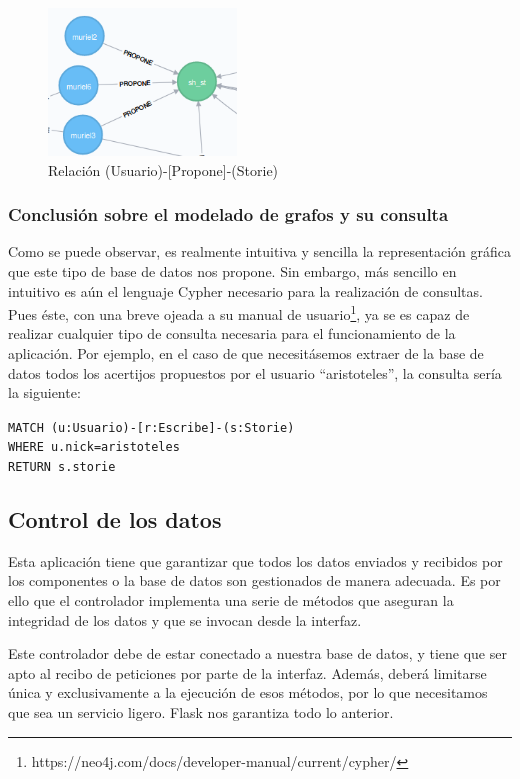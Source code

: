 \begin{figure}[hbtp]
     \centerline{\includegraphics[width=5cm]{figuras/propone.png}}
    \caption{Relación (Usuario)-[Propone]-(Storie)} 
    \label{fig::propone}
\end{figure}

\subsubsection{Conclusión sobre el modelado de grafos y su consulta}

Como se puede observar, es realmente intuitiva y sencilla la representación gráfica que este tipo de base de datos nos propone. Sin embargo, más sencillo  en intuitivo es aún el lenguaje Cypher necesario para la realización de consultas. Pues éste, con una breve ojeada a su manual de usuario\footnote{https://neo4j.com/docs/developer-manual/current/cypher/}, ya se es capaz de realizar cualquier tipo de consulta necesaria para el funcionamiento de la aplicación. Por ejemplo, en el caso de que necesitásemos extraer de la base de datos todos los acertijos propuestos por el usuario ``aristoteles'', la consulta sería la siguiente:
\begin{flushleft}
    \texttt{MATCH (u:Usuario)-[r:Escribe]-(s:Storie)\\ WHERE u.nick=aristoteles\\ RETURN s.storie}

\end{flushleft}

\subsection{Control de los datos}

Esta aplicación tiene que garantizar que todos los datos enviados y recibidos por los componentes o la base de datos son gestionados de manera adecuada. Es por ello que el controlador implementa una serie de métodos  que aseguran la integridad de los datos y que se invocan desde la interfaz.

Este controlador debe de estar conectado a nuestra base de datos, y tiene que ser apto al recibo de peticiones por parte de la interfaz. Además, deberá limitarse única y exclusivamente a la ejecución de esos métodos, por lo que necesitamos que sea un servicio ligero. Flask nos garantiza todo lo anterior.

